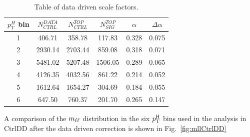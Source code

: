 \begin{table}
\centering
\begin{tabular}{c c c c c c}

\hline\hline

$p_T^H$ bin & $N_{CTRL}^{DATA}$ & $N_{CTRL}^{TOP}$ &  $N_{SIG}^{TOP}$ &
$\alpha$ & $\Delta\alpha$ \\ 

\hline

1 & 406.71 & 358.78 & 117.83 & 0.328 & 0.075 \\ 

2 & 2930.14 & 2703.44 & 859.08 & 0.318 & 0.071 \\ 

3 & 5481.02 & 5207.48 & 1506.05 & 0.289 & 0.065 \\ 

4 & 4126.35 & 4032.56 & 861.22 & 0.214 & 0.052 \\ 

5 & 1612.64 & 1654.27 & 304.69 & 0.184 & 0.055 \\ 

6 & 647.50 & 760.37 & 201.70 & 0.265 & 0.147 \\ 

\hline

\end{tabular}
\caption{Table of data driven scale factors.\label{tab:ttdd}}
\end{table}
A comparison of the $m_{\ell\ell}$ distribution in the six $p_\mathrm{T}^\mathrm{H}$ bins used in the analysis in CtrlDD after the data driven correction is shown in Fig.~\ref{fig:mllCtrlDD}
